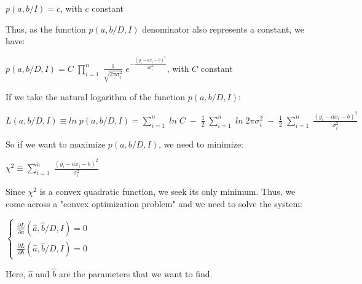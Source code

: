 \documentclass{article}
\begin{document}
$p(a,b/I) = c$, with $c$ constant

\hfill

Thus, as the function $p(a,b/D,I)$ denominator also represents a constant, we have:

\hfill

$p(a,b/D,I) = C \; \prod\limits_{i = 1}^{n} \; \frac{1}{\sqrt{2 \pi \sigma_{i}^{2}}} \; e^{-\frac{(y_{i} - ax_{i} - b)^{2}}{2 \sigma_{i}^{2}}}$, with $C$ constant

\hfill

If we take the natural logarithm of the function $p(a,b/D,I)$:

\hfill

$L(a,b/D,I) \equiv ln \; p(a,b/D,I) = \sum\limits_{i = 1}^{n} \; ln \; C \; - \; \frac{1}{2} \; \sum\limits_{i = 1}^{n} \; ln \; 2 \pi \sigma_{i}^{2} \; - \; \frac{1}{2} \; \sum\limits_{i = 1}^{n} \; \frac{(y_{i} - ax_{i} - b)^{2}}{\sigma_{i}^{2}}$

\hfill

So if we want to maximize $p(a,b/D,I)$, we need to minimize:

\hfill

$\chi^{2} \equiv \sum\limits_{i = 1}^{n} \; \frac{(y_{i} - ax_{i} - b)^{2}}{\sigma_{i}^{2}}$

\hfill

Since $\chi^{2}$ is a convex quadratic function, we seek its only minimum. Thus, we come across a "convex optimization problem" and we need to solve the system:

\hfill

$\begin{cases} \frac{\partial L}{\partial a} (\hat{a},\hat{b}/D,I) = 0 \\ \frac{\partial L}{\partial b} (\hat{a},\hat{b}/D,I) = 0 \end{cases}$

\hfill

Here, $\hat{a}$ and $\hat{b}$ are the parameters that we want to find.
\end{document}
